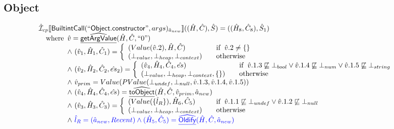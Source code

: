 \documentclass{article}
\newcommand{\SF}[1]{\mbox{\textsf{#1}}}
\newcommand{\wherec}[1]{{\rm where}\begin{array}[t]{l}#1\end{array}}
\newcommand{\ifc}[1]{{\rm if}\begin{array}[t]{l}#1\end{array}}
\newcommand{\owc}{{\rm otherwise}}
\newcommand{\aI}{\hat{\mathcal{I}}}
\newcommand{\lbr}{\llbracket}
\newcommand{\rbr}{\rrbracket}
\newcommand{\ahf}[1]{\widehat{\underline{\sf #1}}}
\def\inblue{\color{blue}}
\def\inblue{\color{blue}}
\begin{document}
\subsection{Object}
\[
\begin{array}{l}

\aI _{cp}\lbr \SF{BuiltintCall}(``\SF{Object.constructor}",args)_{\hat{a}_{new}}\rbr((\hat{H},\hat{C}), \hat{S})
  = ((\hat{H}_8, \hat{C}_8), \hat{S}_1)\\
\quad\wherec{
  \hat{v} = \ahf{getArgValue}(\hat{H}, \hat{C}, ``0")\\
  \land\ (\hat{v}_1, \hat{H}_1, \hat{C}_1 )=
    \left\{\begin{array}{l@{\quad\quad}l}
      (Value(\hat{v}.2), \hat{H}, \hat{C}) & \ifc{\hat{v}.2 \neq \{ \} }\\
      (\bot_{value}, \bot_{heap}, \bot_{context}) & \owc \\
    \end{array}\right.\\
  \land\ (\hat{v}_2, \hat{H}_2, \hat{C}_2, \hat{es}_2 )=
    \left\{\begin{array}{l@{\quad\quad}l}
      (\hat{v}_4, \hat{H}_4, \hat{C}_4, \hat{es})
      & \ifc{\hat{v}.1.3 \not\sqsubseteq \bot_{bool}
         \lor \hat{v}.1.4 \not\sqsubseteq \bot_{num} \lor \hat{v}.1.5 \not\sqsubseteq \bot_{string}}\\
      (\bot_{value}, \bot_{heap}, \bot_{context},\{ \}) & \owc \\
    \end{array}\right.\\
  \land\ \hat{v}_{prim} = Value(PValue(\bot_{undef}, \bot_{null}, \hat{v}.1.3, \hat{v}.1.4, \hat{v}.1.5))\\
  \land\ (\hat{v}_4, \hat{H}_4, \hat{C}_4, \hat{es} ) = \ahf{toObject}(\hat{H}, \hat{C}, \hat{v}_{prim}, \hat{a}_{new})\\
  \land\ (\hat{v}_3, \hat{H}_3, \hat{C}_3 )=
    \left\{\begin{array}{l@{\quad\quad}l}
      (Value(\{\hat{l}_{R}\}), \hat{H}_6, \hat{C}_5)
      & \ifc{\hat{v}.1.1 \not\sqsubseteq \bot_{undef} \lor \hat{v}.1.2 \not\sqsubseteq \bot_{null}}\\
      (\bot_{value}, \bot_{heap}, \bot_{context}) & \owc \\
    \end{array}\right.\\
  \land\ \inblue\hat{l}_{R} = (\hat{a}_{new}, Recent)
  \land \inblue (\hat{H}_5, \hat{C}_5) = \ahf{Oldify}(\hat{H}, \hat{C}, \hat{a}_{new})
}
\end{array}\]
\end{document}

